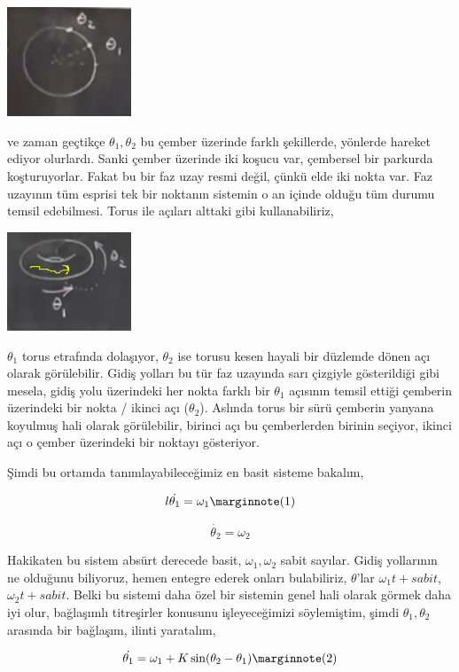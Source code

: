 \documentclass[12pt,fleqn]{article}\usepackage{../../common}
\begin{document}
\includegraphics[width=10em]{14_20.png}

ve zaman geçtikçe $\theta_1,\theta_2$ bu çember üzerinde farklı şekillerde,
yönlerde hareket ediyor olurlardı. Sanki çember üzerinde iki koşucu var,
çembersel bir parkurda koşturuyorlar. Fakat bu bir faz uzay resmi değil,
çünkü elde iki nokta var. Faz uzayının tüm esprisi tek bir noktanın
sistemin o an içinde olduğu tüm durumu temsil edebilmesi. Torus ile açıları
alttaki gibi kullanabiliriz, 

\includegraphics[width=10em]{14_21.png}

$\theta_1$ torus etrafında dolaşıyor, $\theta_2$ ise torusu kesen hayali
bir düzlemde dönen açı olarak görülebilir. Gidiş yolları bu tür faz
uzayında sarı çizgiyle gösterildiği gibi mesela, gidiş yolu üzerindeki her
nokta farklı bir $\theta_1$ açısının temsil ettiği çemberin üzerindeki bir
nokta / ikinci açı ($\theta_2$). Aslında torus bir sürü çemberin yanyana
koyulmuş hali olarak görülebilir, birinci açı bu çemberlerden birinin
seçiyor, ikinci açı o çember üzerindeki bir noktayı gösteriyor. 

Şimdi bu ortamda tanımlayabileceğimiz en basit sisteme bakalım, 

$$l
\dot{\theta_1} = \omega_1 
\mlabel{1}
$$

$$ \dot{\theta_2} = \omega_2 $$

Hakikaten bu sistem absürt derecede basit, $\omega_1,\omega_2$ sabit
sayılar. Gidiş yollarının ne olduğunu biliyoruz, hemen entegre ederek
onları bulabiliriz, $\theta$'lar $\omega_1t + sabit$, $\omega_2t +
sabit$. Belki bu sistemi daha özel bir sistemin genel hali olarak görmek
daha iyi olur, bağlaşımlı titreşirler konusunu işleyeceğimizi söylemiştim,
şimdi $\theta_1,\theta_2$ arasında bir bağlaşım, ilinti yaratalım, 

$$ 
\dot{\theta_1} = \omega_1 + K \sin(\theta_2-\theta_1) 
\mlabel{2}$$
\end{document}
